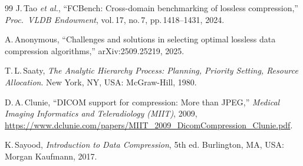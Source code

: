 \documentclass[journal]{IEEEtran}
\begin{document}
\begin{thebibliography}{99}
J.\,Tao \textit{et al.}, ``FCBench: Cross-domain benchmarking of lossless
compression,'' \textit{Proc.\ VLDB Endowment}, vol.\,17, no.\,7,
pp.\,1418--1431, 2024.

A.\,Anonymous, ``Challenges and solutions in selecting optimal lossless data
compression algorithms,'' arXiv:2509.25219, 2025.

T.\,L.\,Saaty, \textit{The Analytic Hierarchy Process: Planning, Priority
Setting, Resource Allocation}. New York, NY, USA: McGraw-Hill, 1980.

D.\,A.\,Clunie, ``DICOM support for compression: More than JPEG,''
\textit{Medical Imaging Informatics and Teleradiology (MIIT)}, 2009,
\url{https://www.dclunie.com/papers/MIIT_2009_DicomCompression_Clunie.pdf}.

K.\,Sayood, \textit{Introduction to Data Compression}, 5th ed.
Burlington, MA, USA: Morgan Kaufmann, 2017.

\end{thebibliography}
\end{document}
